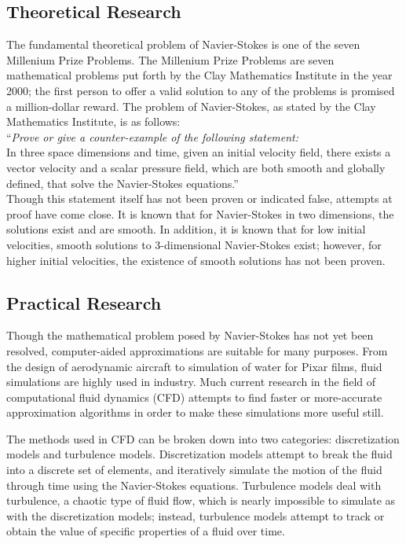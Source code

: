 \documentclass[a4paper]{article}
\begin{document}
\subsection{Theoretical Research}
The fundamental theoretical problem of Navier-Stokes is one of the seven Millenium Prize Problems. The Millenium Prize Problems are seven mathematical problems put forth by the Clay Mathematics Institute in the year 2000; the first person to offer a valid solution to any of the problems is promised a million-dollar reward. The problem of Navier-Stokes, as stated by the Clay Mathematics Institute, is as follows:\\


``\emph{Prove or give a counter-example of the following statement:}\\

In three space dimensions and time, given an initial velocity field, there exists a vector velocity and a scalar pressure field, which are both smooth and globally defined, that solve the Navier-Stokes equations.''\\


Though this statement itself has not been proven or indicated false, attempts at proof have come close. It is known that for Navier-Stokes in two dimensions, the solutions exist and are smooth. In addition, it is known that for low initial velocities, smooth solutions to 3-dimensional Navier-Stokes exist; however, for higher initial velocities, the existence of smooth solutions has not been proven. 

\subsection{Practical Research}
Though the mathematical problem posed by Navier-Stokes has not yet been resolved, computer-aided approximations are suitable for many purposes. From the design of aerodynamic aircraft to simulation of water for Pixar films, fluid simulations are highly used in industry. Much current research in the field of computational fluid dynamics (CFD) attempts to find faster or more-accurate approximation algorithms in order to make these simulations more useful still.

The methods used in CFD can be broken down into two categories: discretization models and turbulence models. Discretization models attempt to break the fluid into a discrete set of elements, and iteratively simulate the motion of the fluid through time using the Navier-Stokes equations. Turbulence models deal with turbulence, a chaotic type of fluid flow, which is nearly impossible to simulate as with the discretization models; instead, turbulence models attempt to track or obtain the value of specific properties of a fluid over time.
\end{document}
